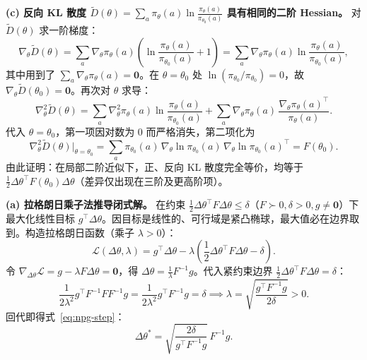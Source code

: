 \textbf{(c) 反向 KL 散度 $\tilde{D}(\theta) = \sum_a \pi_\theta(a)\ln\frac{\pi_\theta(a)}{\pi_{\theta_0}(a)}$ 具有相同的二阶 Hessian。} 对 $\tilde{D}(\theta)$ 求一阶梯度：
\[
  \nabla_\theta \tilde{D}(\theta)
  = \sum_a \nabla_\theta \pi_\theta(a)\left(\ln\frac{\pi_\theta(a)}{\pi_{\theta_0}(a)} + 1\right)
  = \sum_a \nabla_\theta \pi_\theta(a)\ln\frac{\pi_\theta(a)}{\pi_{\theta_0}(a)},
\]
其中用到了 $\sum_a \nabla_\theta \pi_\theta(a) = \mathbf{0}$。在 $\theta = \theta_0$ 处 $\ln(\pi_{\theta_0}/\pi_{\theta_0}) = 0$，故 $\nabla_\theta \tilde{D}(\theta_0) = \mathbf{0}$。再次对 $\theta$ 求导：
\[
  \nabla_\theta^2 \tilde{D}(\theta)
  = \sum_a \nabla_\theta^2 \pi_\theta(a)\ln\frac{\pi_\theta(a)}{\pi_{\theta_0}(a)}
  + \sum_a \nabla_\theta \pi_\theta(a)\,\frac{\nabla_\theta \pi_\theta(a)^\top}{\pi_\theta(a)}.
\]
代入 $\theta = \theta_0$，第一项因对数为 $0$ 而严格消失，第二项化为
\[
  \nabla_\theta^2 \tilde{D}(\theta)\big|_{\theta=\theta_0}
  = \sum_a \pi_{\theta_0}(a)\,\nabla_\theta \ln \pi_{\theta_0}(a)\,\nabla_\theta \ln \pi_{\theta_0}(a)^\top = F(\theta_0).
\]
由此证明：在局部二阶近似下，正、反向 KL 散度完全等价，均等于 $\frac{1}{2}\Delta\theta^\top F(\theta_0)\Delta\theta$（差异仅出现在三阶及更高阶项）。


\textbf{(a) 拉格朗日乘子法推导闭式解。} 在约束 $\frac{1}{2}\Delta\theta^\top F \Delta\theta \le \delta$（$F \succ 0, \delta > 0, g \neq \mathbf{0}$）下最大化线性目标 $g^\top \Delta\theta$。因目标是线性的、可行域是紧凸椭球，最大值必在边界取到。构造拉格朗日函数（乘子 $\lambda > 0$）：
\[
  \mathcal{L}(\Delta\theta, \lambda) = g^\top \Delta\theta - \lambda\left(\frac{1}{2}\Delta\theta^\top F \Delta\theta - \delta\right).
\]
令 $\nabla_{\Delta\theta}\mathcal{L} = g - \lambda F \Delta\theta = \mathbf{0}$，得 $\Delta\theta = \frac{1}{\lambda} F^{-1} g$。代入紧约束边界 $\frac{1}{2}\Delta\theta^\top F \Delta\theta = \delta$：
\[
  \frac{1}{2\lambda^2} g^\top F^{-1} F F^{-1} g = \frac{1}{2\lambda^2} g^\top F^{-1} g = \delta
  \implies \lambda = \sqrt{\frac{g^\top F^{-1} g}{2\delta}} > 0.
\]
回代即得式~\eqref{eq:npg-step}：
\[
  \Delta\theta^* = \sqrt{\frac{2\delta}{g^\top F^{-1} g}}\,F^{-1} g.
\]

